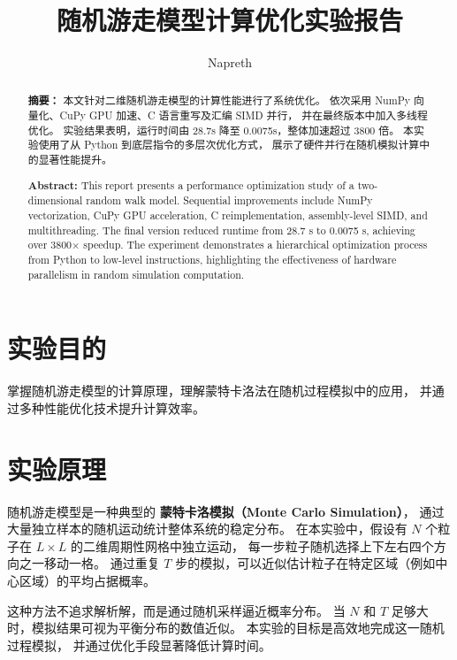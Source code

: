 \documentclass[a4paper,12pt]{article}
\renewcommand{\today}{\number\year年\number\month月\number\day日}  %
\begin{document}
\begin{CJK}{UTF8}{gbsn}       %

	\title{随机游走模型计算优化实验报告}
	\author{Napreth}
	\date{\today}
	\maketitle

	\begin{abstract}
		\textbf{摘要：}
		本文针对二维随机游走模型的计算性能进行了系统优化。
		依次采用 NumPy 向量化、CuPy GPU 加速、C 语言重写及汇编 SIMD 并行，
		并在最终版本中加入多线程优化。
		实验结果表明，运行时间由 28.7s 降至 0.0075s，整体加速超过 3800 倍。
		本实验使用了从 Python 到底层指令的多层次优化方式，
		展示了硬件并行在随机模拟计算中的显著性能提升。

		\textbf{Abstract:}
		This report presents a performance optimization study of a two-dimensional random walk model.
		Sequential improvements include NumPy vectorization, CuPy GPU acceleration, C reimplementation, assembly-level SIMD, and multithreading.
		The final version reduced runtime from 28.7 s to 0.0075 s, achieving over 3800× speedup.
		The experiment demonstrates a hierarchical optimization process from Python to low-level instructions,
		highlighting the effectiveness of hardware parallelism in random simulation computation.
	\end{abstract}


	\section{实验目的}
	掌握随机游走模型的计算原理，理解蒙特卡洛法在随机过程模拟中的应用，
	并通过多种性能优化技术提升计算效率。

	\section{实验原理}
	随机游走模型是一种典型的 \textbf{蒙特卡洛模拟（Monte Carlo Simulation）}，
	通过大量独立样本的随机运动统计整体系统的稳定分布。
	在本实验中，假设有 $N$ 个粒子在 $L \times L$ 的二维周期性网格中独立运动，
	每一步粒子随机选择上下左右四个方向之一移动一格。
	通过重复 $T$ 步的模拟，可以近似估计粒子在特定区域（例如中心区域）的平均占据概率。

	这种方法不追求解析解，而是通过随机采样逼近概率分布。
	当 $N$ 和 $T$ 足够大时，模拟结果可视为平衡分布的数值近似。
	本实验的目标是高效地完成这一随机过程模拟，
	并通过优化手段显著降低计算时间。


\end{CJK}
\end{document}
